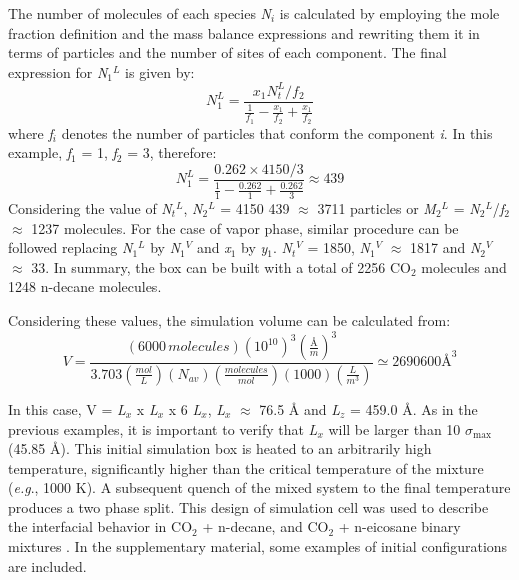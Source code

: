 \documentclass{scrbook}
\begin{document}
The number of molecules of each species \textit{N}$_{i}$ is calculated by
employing the mole fraction definition and the mass balance expressions and
rewriting them it in terms of particles and the number of sites of each
component. The final expression for \textit{N}$_{1}$$^{L}$ is given by:
\begin{equation}
N_{1}^{L}=\frac{x_{1}N_{t}^{L}/f_{2}}{\frac{1}{f_{1}}-\frac{x_{1}}{f_{2}}+\frac{x_{1}}{f_{2}}}
\end{equation}
where \textit{f}$_{i}$ denotes the number of particles that conform the
component \textit{i}. In this example, \textit{f}$_{1}$ = 1, \textit{f}$_{2}$
= 3, therefore:
\begin{equation}
N_{1}^{L}=\frac{0.262\times4150/3}{\frac{1}{1}-\frac{0.262}{1}+\frac{0.262}{3}}\approx439
\end{equation}
Considering the value of \textit{N}$_{t}$$^{L}$, \textit{N}$_{2}$$^{L}$ = 4150
\textendash{} 439 ${\approx}$ 3711 particles or \textit{M}$_{2}$$^{L}$
= \textit{N}$_{2}$$^{L}$/\textit{f}$_{2}$ ${\approx}$ 1237 molecules. For the
case of vapor phase, similar procedure can be followed replacing
\textit{N}$_{1}$$^{L}$ by \textit{N}$_{1}$$^{V}$ and \textit{x}$_{1}$ by
\textit{y}$_{1}$. \textit{N}$_{t}$$^{V}$ = 1850, \textit{N}$_{1}$$^{V}$
${\approx}$ 1817 and \textit{N}$_{2}$$^{V}$ ${\approx}$ 33. In summary, the box
can be built with a total of 2256 CO$_{2}$ molecules and 1248 n-decane
molecules.

Considering these values, the simulation volume can be calculated from:
\begin{equation}
V=\frac{\left(6000\,molecules\right)\left(10^{10}\right)^{3}\left(\frac{\textrm{Å}}{m}\right)^{3}}{3.703\left(\frac{mol}{L}\right)\left(N_{av}\right)\left(\frac{molecules}{mol}\right)\left(1000\right)\left(\frac{L}{m^{3}}\right)}\simeq2690600\textrm{Å}^{3}
\end{equation}

In this case, V = \textit{L}$_{x}$ x \textit{L}$_{x}$ x 6 \textit{L}$_{x}$,
\textit{L}$_{x}$ ${\approx}$ 76.5 \AA{} and \textit{L}$_{z}$ = 459.0 \AA{}. As
in the previous examples, it is important to verify that \textit{L}$_{x}$ will
be larger than 10 ${\sigma}$$_{\mathrm{max}}$ (45.85 \AA{}). This initial
simulation box is heated to an arbitrarily high temperature, significantly
higher than the critical temperature of the mixture (\textit{e.g}., 1000 K).
A subsequent quench of the mixed system to the final temperature produces a two
phase split. This design of simulation cell was used to describe the
interfacial behavior in CO$_{2}$ + n-decane, and CO$_{2}$ + n-eicosane binary
mixtures \citep{mejia2014b}. In the supplementary material, some
examples of initial configurations are included.  
\end{document}
